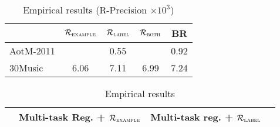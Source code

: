 \begin{table}[!h]
\centering
\caption{Empirical results (R-Precision $\times 10^3$)}
\small
\begin{tabular}{l|cccc}
\toprule
{}            & $\mathcal{R}_\textsc{example}$ & $\mathcal{R}_\textsc{label}$ & $\mathcal{R}_\textsc{both}$ & BR \\
\midrule
AotM-2011     &  & 0.55 &  & 0.92 \\
30Music       & 6.06 & 7.11 & 6.99 & 7.24 \\
\bottomrule
\end{tabular}
\end{table}

\begin{table}[!h]
\centering
\caption{Empirical results}
\begin{tabular}{l|ccc}
\toprule
{}            & Multi-task Reg. + $\mathcal{R}_\textsc{example}$ & Multi-task reg. + $\mathcal{R}_\textsc{label}$ \\
\midrule
\bottomrule
\end{tabular}
\end{table}
